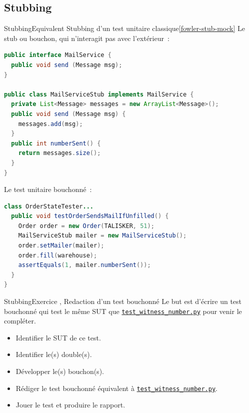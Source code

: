 \documentclass{beamer}
\begin{document}
    \subsection{Stubbing}\label{subsec:stubbing}

    \begin{frame}[fragile]{Stubbing}{Equivalent Stubbing d'un test unitaire classique\cref{fowler-stub-mock}}
        Le stub ou bouchon, qui n'interagit pas avec l'extérieur~:
        \begin{lstlisting}[language=Java,basicstyle=\ttfamily\tiny]
public interface MailService {
  public void send (Message msg);
}

public class MailServiceStub implements MailService {
  private List<Message> messages = new ArrayList<Message>();
  public void send (Message msg) {
    messages.add(msg);
  }
  public int numberSent() {
    return messages.size();
  }
}
        \end{lstlisting}
        Le test unitaire bouchonné~:
        \begin{lstlisting}[language=Java,basicstyle=\ttfamily\tiny]
class OrderStateTester...
  public void testOrderSendsMailIfUnfilled() {
    Order order = new Order(TALISKER, 51);
    MailServiceStub mailer = new MailServiceStub();
    order.setMailer(mailer);
    order.fill(warehouse);
    assertEquals(1, mailer.numberSent());
  }
}
        \end{lstlisting}
    \end{frame}

    \begin{frame}[fragile]{Stubbing}{Exercice \execcounterdispinc, Redaction d'un test bouchonné}
        Le but est d'écrire un test bouchonné qui test le même SUT que \href{https://github.com/St-Michel-IT/testing/blob/master/test_customer_database.py}{\lstinline{test_witness_number.py}} pour venir le compléter.
        \begin{itemize}
            \item Identifier le SUT de ce test.
            \item Identifier le(s) double(s).
            \item Développer le(s) bouchon(s).
            \item Rédiger le test bouchonné équivalent à \href{https://github.com/St-Michel-IT/testing/blob/master/test_customer_database.py}{\lstinline{test_witness_number.py}}.
            \item Jouer le test et produire le rapport.
        \end{itemize}
    \end{frame}
\end{document}
